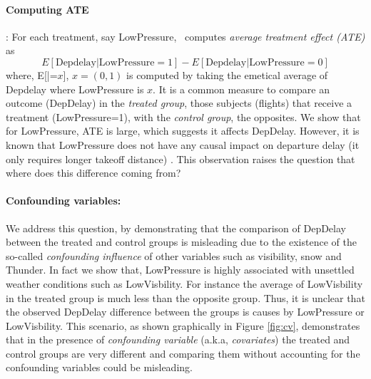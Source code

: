  \paragraph{ \bf Computing ATE}:   For each treatment, say LowPressure, \GSQL\ computes {\em average treatment effect (ATE)} as $$E[\text{Depdelay}|\text{LowPressure}=1] - E[\text{Depdelay}|\text{LowPressure}=0]$$
  where, E[|=$x$], $x=(0,1)$ is computed by taking the emetical average of  Depdelay where LowPressure is  $x$. It is a  common measure to compare an 
  outcome (DepDelay) in the {\em treated group},  those subjects (flights) that receive a treatment (LowPressure=1), with the {\em control group}, the opposites. 
  We show that for LowPressure, ATE is large, which  suggests  it affects DepDelay. However, it is known that
  LowPressure does not have any causal impact on departure delay (it only requires longer takeoff distance) \cite{FAA08}. This observation raises the question that  where does this difference coming from?

 \paragraph{\bf Confounding variables:}  We address this question, by demonstrating that the comparison of DepDelay between the treated and control groups is misleading due to the existence of the so-called {\em  confounding influence} of other variables such as visibility, snow and Thunder.  In fact we show that, LowPressure is highly associated with unsettled weather conditions such as LowVisbility. For instance the average of LowVisbility in the treated group is much less than
  the opposite group. Thus, it is unclear that the observed DepDelay difference between the groups is causes by LowPressure or LowVisbility. This scenario, as shown graphically in Figure \ref{fig:cv}, demonstrates that in the presence of {\em confounding variable} (a.k.a, {\em covariates}) the treated and control groups are very different and comparing them without accounting for the confounding variables could be misleading.


